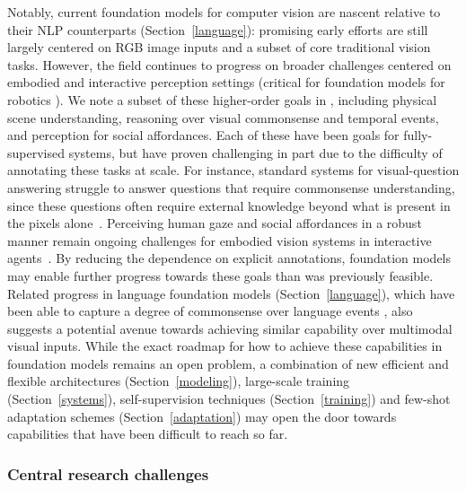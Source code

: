 Notably, current foundation models for computer vision are nascent relative to their NLP counterparts (Section~\ref{language}): promising early efforts are still largely centered on RGB image inputs and a subset of core traditional vision tasks. However, the field continues to progress on broader challenges centered on embodied and interactive perception settings (critical for foundation models for robotics \citep[][Section~\ref{robotics}]{bohg2017interactive}). We note a subset of these higher-order goals in , including physical scene understanding, reasoning over visual commonsense and temporal events, and perception for social affordances. Each of these have been goals for fully-supervised systems, but have proven challenging in part due to the difficulty of annotating these tasks at scale. For instance, standard systems for visual-question answering struggle to answer questions that require commonsense understanding, since these questions often require external knowledge beyond what is present in the pixels alone~\cite{zellers2019vcr}. Perceiving human gaze and social affordances in a robust manner remain ongoing challenges for embodied vision systems in interactive agents~\cite{martin2021jrdb}. By reducing the dependence on explicit annotations, foundation models may enable further progress towards these goals than was previously feasible. Related progress in language foundation models (Section~\ref{language}), which have been able to capture a degree of commonsense over language events \cite{brown2020gpt3}, also suggests a potential avenue towards achieving similar capability over multimodal visual inputs. While the exact roadmap for how to achieve these capabilities in foundation models remains an open problem, a combination of new efficient and flexible architectures (Section~\ref{modeling}), large-scale training (Section~\ref{systems}), self-supervision techniques (Section~\ref{training}) and few-shot adaptation schemes (Section~\ref{adaptation}) may open the door towards capabilities that have been difficult to reach so far.

\subsubsection{Central research challenges}
\label{sec:vision-challenges}

